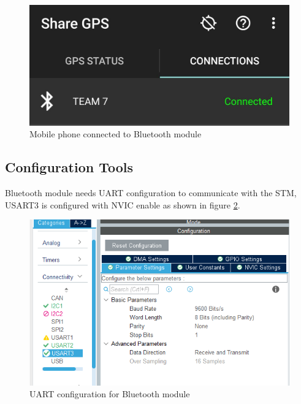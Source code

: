 \begin{figure}[h]
    \centering
    \includegraphics[width = .8\textwidth]{figure/5_11.jpg}
    \caption{Mobile phone connected to Bluetooth module}
    \label{fig:mobile-bt2}
    \end{figure}
  \newpage  


\subsection{Configuration Tools}

Bluetooth module needs UART configuration to communicate with the STM, USART3 is configured with NVIC enable as shown in figure \ref{fig:uart-config-bt}.

\begin{figure}[h]
    \centering
    \includegraphics[width = .8\textwidth]{figure/5_13.PNG}
    \caption{UART configuration for Bluetooth module}
    \label{fig:uart-config-bt}
    \end{figure}
 

